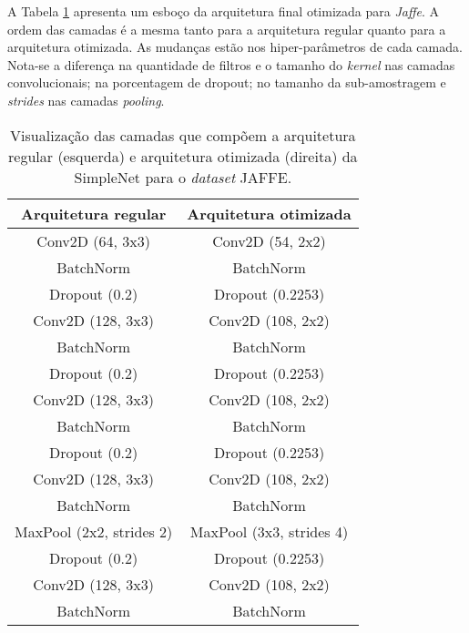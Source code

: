 \documentclass[
12pt,       %
openright,      %
oneside,      %
a4paper,      %
english,      %
french,       %
spanish,      %
brazil        %
]{abntex2}
\begin{document}
A Tabela \ref{tab:comparacao-simplenet-jaffe} apresenta um esboço da arquitetura final otimizada para \textit{Jaffe}. A ordem das camadas é a mesma tanto para a arquitetura regular quanto para a arquitetura otimizada. As mudanças estão nos hiper-parâmetros de cada camada. Nota-se a diferença na quantidade de filtros e o tamanho do \textit{kernel} nas camadas convolucionais; na porcentagem de dropout; no tamanho da sub-amostragem e \textit{strides} nas camadas \textit{pooling}.

\begin{table}[H]
\centering
\caption{Visualização das camadas que compõem a arquitetura regular (esquerda) e arquitetura otimizada (direita) da SimpleNet para o \textit{dataset} JAFFE.}
\label{tab:comparacao-simplenet-jaffe}
\begin{tabular}{@{}cc@{}}
\toprule
\textbf{Arquitetura regular} & \textbf{Arquitetura otimizada} \\ \midrule
Conv2D (64, 3x3)                  & Conv2D (54, 2x2)                    \\
BatchNorm                    & BatchNorm                      \\
Dropout (0.2)                & Dropout (0.2253)               \\
Conv2D (128, 3x3)                 & Conv2D (108, 2x2)                   \\
BatchNorm                    & BatchNorm                      \\
Dropout (0.2)                & Dropout (0.2253)               \\
Conv2D (128, 3x3)                 & Conv2D (108, 2x2)                   \\
BatchNorm                    & BatchNorm                      \\
Dropout (0.2)                & Dropout (0.2253)               \\
Conv2D (128, 3x3)                 & Conv2D (108, 2x2)                   \\
BatchNorm                    & BatchNorm                      \\
MaxPool (2x2, strides 2)     & MaxPool (3x3, strides 4)       \\
Dropout (0.2)                & Dropout (0.2253)               \\
Conv2D (128, 3x3)                 & Conv2D (108, 2x2)                   \\
BatchNorm                    & BatchNorm                      \\

\end{tabular}
\end{table}
\end{document}
